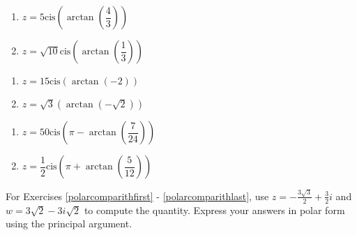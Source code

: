 \begin{multicols}{2} 

\begin{enumerate}

\setcounter{enumi}{\value{HW}}

\item $z = 5\text{cis}\left(\arctan\left(\dfrac{4}{3}\right)\right)$
\item $z = \sqrt{10}\text{cis}\left(\arctan\left(\dfrac{1}{3}\right)\right)$ 

\setcounter{HW}{\value{enumi}}

\end{enumerate}

\end{multicols}

\begin{multicols}{2} 

\begin{enumerate}

\setcounter{enumi}{\value{HW}}

\item $z = 15\text{cis}\left(\arctan\left(-2\right)\right)$ 
\item $z=  \sqrt{3}\left(\arctan\left(-\sqrt{2}\right)\right)$

\setcounter{HW}{\value{enumi}}

\end{enumerate}

\end{multicols}

\begin{multicols}{2} 

\begin{enumerate}

\setcounter{enumi}{\value{HW}}

\item $z = 50\text{cis}\left(\pi-\arctan\left(\dfrac{7}{24}\right)\right)$ 
\item  $z = \dfrac{1}{2}\text{cis}\left(\pi+\arctan\left(\dfrac{5}{12}\right)\right)$ \label{rectcomplast}

\setcounter{HW}{\value{enumi}}

\end{enumerate}

\end{multicols}

For Exercises \ref{polarcomparithfirst} - \ref{polarcomparithlast}, use $z = -\frac{3\sqrt{3}}{2} + \frac{3}{2}i$ and $w = 3\sqrt{2} - 3i\sqrt{2}$ to compute the quantity.  Express your answers in polar form using the principal argument.

